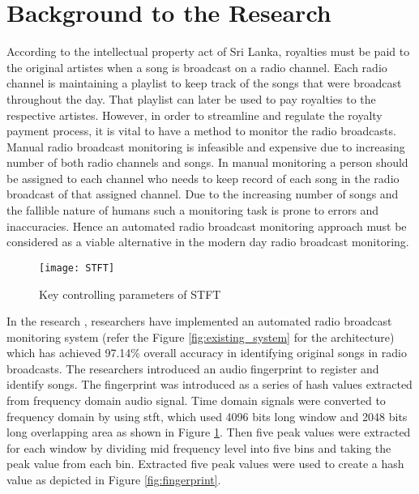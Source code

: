 \section{Background to the Research}
\vspace{12pt}

According to the intellectual property act of Sri Lanka\cite{CopyrightAct}, royalties must be paid to the original
artistes when a song is broadcast on a radio channel. Each radio channel is maintaining a playlist to keep track of
the songs that were broadcast throughout the day. That playlist can later be used to pay royalties to the respective
artistes. However, in order to streamline and regulate the royalty payment process, it is vital to have a method to monitor the radio 
broadcasts. Manual radio broadcast monitoring is infeasible and expensive due to increasing number of both radio 
channels and songs. In manual monitoring a person should be assigned to each channel who needs to keep record of each 
song in the radio broadcast of that assigned channel. Due to the increasing number of songs and the fallible nature of
humans such a monitoring task is prone to errors and inaccuracies. Hence an automated radio broadcast 
monitoring approach must be considered as a viable alternative in the modern day radio broadcast monitoring.
\vspace{12pt}

\begin{figure}[H]
    \centering
    \texttt{[image: STFT]}
    \caption{Key controlling parameters of STFT\cite{Nishan}}
    \label{fig:stft}
\end{figure}
\vspace{12pt}

In the research \cite{Nishan}, researchers have implemented an
automated radio broadcast monitoring system (refer the Figure \ref{fig:existing_system} for the architecture) which has 
achieved 97.14\% overall accuracy in identifying original songs
in radio broadcasts. The researchers introduced an audio fingerprint to register and identify songs. The fingerprint was
introduced as a series of hash values extracted from frequency domain audio signal. Time domain signals were converted to 
frequency domain by using \ac{stft}, which used 4096 bits long window and 2048
bits long overlapping area as shown in Figure \ref{fig:stft}. Then five peak values were extracted for each window by 
dividing mid frequency level into five bins and taking the peak value from each bin. Extracted five peak values were used to 
create a hash value as depicted in Figure \ref{fig:fingerprint}. 

